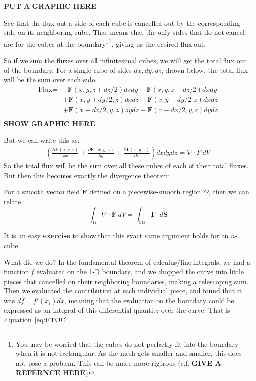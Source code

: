 \documentclass[../master.tex]{subfiles}
\begin{document}
	\textbf{PUT A GRAPHIC HERE}
	
	See that the flux out a side of each cube is cancelled out by the corresponding side on its neighboring cube. That means that the only sides that do not cancel are for the cubes at the boundary$^1$\footnote{You may be worried that the cubes do not perfectly fit into the boundary when it is not rectangular. As the mesh gets smaller and smaller, this does not pose a problem. This can be made more rigorous (c.f. \textbf{GIVE A REFERNCE HERE})}, giving us the desired flux out.
	
	So if we sum the fluxes over all infinitesimal cubes, we will get the total flux out of the boundary. For a single cube of sides $dx,dy,dz$, drawn below, the total flux will be the sum over each side. 
	\begin{align*}
		\text{Flux} =&~~~ \mathbf F(x,y,z+dz/2) dx dy - \mathbf F(x,y,z-dz/2) dx dy \\ 
						   & + \mathbf F(x,y+dy/2,z) dx dz - \mathbf F(x,y-dy/2,z) dx dz \\ 
						   & + \mathbf F(x+dx/2,y,z) dy dz - \mathbf F(x-dx/2,y,z) dy dz \\ 
	\end{align*}
	\textbf{SHOW GRAPHIC HERE}
	
	But we can write this as: 
	\begin{align*}
		\left( \frac{\partial \mathbf F(x,y,z)}{\partial x} + \frac{\partial \mathbf F(x,y,z)}{\partial y} + \frac{\partial \mathbf F(x,y,z)}{\partial z} \right) dx dy dz = \nabla \cdot F ~ dV
	\end{align*}
	So the total flux will be the sum over all these cubes of each of their total fluxes. But then this becomes exactly the divergence theorem:
	\begin{theorem}
	For a smooth vector field $\mathbf F$ defined on a piecewise-smooth region $\Omega$, then we can relate
		\begin{equation*}
			\int_\Omega \nabla \cdot \mathbf F ~ dV = \int_{\partial \Omega} \mathbf{F} \cdot d \mathbf S
		\end{equation*}
	\end{theorem}
	
	It is an easy \textbf{exercise} to show that this exact same argument holds for an $n$-cube. 
	
	What did we do? In the fundamental theorem of calculus/line integrals, we had a function $f$ evaluated on the 1-D boundary, and we chopped the curve into little pieces that cancelled on their neighboring boundaries, making a telescoping sum. Then we evaluated the contribution at each individual piece, and found that it was $df = f'(x_i) dx$, meaning that the evaluation on the boundary could be expressed as an integral of this differential quantity over the curve. That is Equation~\eqref{eq:FTOC}.
	
\end{document}
